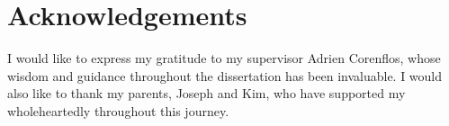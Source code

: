 \chapter*{Acknowledgements}
I would like to express my gratitude to my supervisor Adrien Corenflos, whose wisdom and guidance throughout the dissertation has been invaluable. I would also like to thank my parents, Joseph and Kim, who have supported my wholeheartedly throughout this journey.